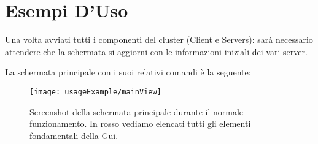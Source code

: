 \section{Esempi D'Uso}
Una volta avviati tutti i componenti del cluster (Client e Servers): sarà necessario attendere che la schermata si aggiorni con le informazioni iniziali dei vari server.

La schermata principale con i suoi relativi comandi è la seguente:

\begin{figure}[H]
	\centering
	\texttt{[image: usageExample/mainView]}
	\caption[usageExampleCaption]{Screenshot della schermata principale durante il normale funzionamento. In rosso vediamo elencati tutti gli elementi fondamentali della Gui.}
	\label{fig:figure15}
\end{figure}


